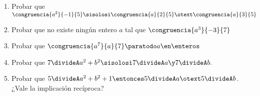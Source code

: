 \begin{enunciado}{\ejercicio}
  \begin{enumerate}[label=\alph*)]
    \item Probar que $\congruencia{a^2}{-1}{5} \sisolosi \congruencia{a}{2}{5}  \otext \congruencia{a}{3}{5}$
    \item Probar que no existe ningún entero $a$ tal que $\congruencia{a^3}{-3}{7}$
    \item Probar que $\congruencia{a^7}{a}{7} \paratodo a \en \enteros$
    \item Probar que $7 \divideA a^2 + b^2 \sisolosi 7 \divideA a \y 7 \divideA b.$
    \item Probar que $5 \divideA a^2 + b^2 + 1 \entonces 5 \divideA a \otext 5 \divideA b$.
          ¿Vale la implicación recíproca?
  \end{enumerate}
\end{enunciado}

